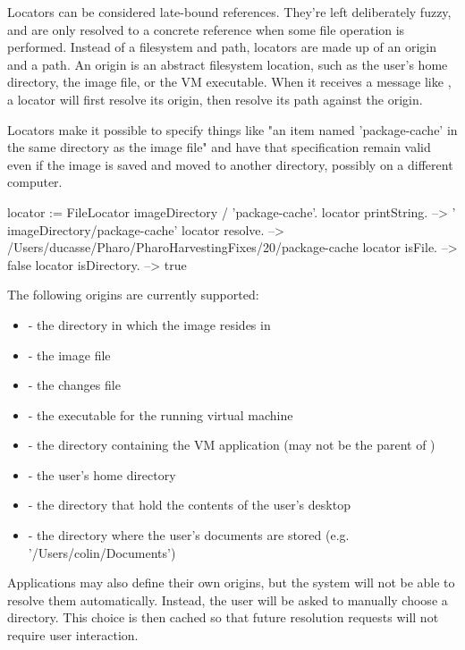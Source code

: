 \documentclass[a4paper,10pt,twoside]{book}
\begin{document}
Locators can be considered late-bound references. They're left deliberately fuzzy, and are only resolved to a concrete reference when some file operation is performed. Instead of a filesystem and path, locators are made up of an origin and a path. An origin is an abstract filesystem location, such as the user's home directory, the image file, or the VM executable. When it receives a message like , a locator will first resolve its origin, then resolve its path against the origin.

Locators make it possible to specify things like "an item named 'package-cache' in the same directory as the image file" and have that specification remain valid even if the image is saved and moved to another directory, possibly on a different computer.

\begin{code}{}
    locator := FileLocator imageDirectory / 'package-cache'.
    locator printString.             --> ' {imageDirectory}/package-cache'
    locator resolve.                 -->  /Users/ducasse/Pharo/PharoHarvestingFixes/20/package-cache
    locator isFile.                  --> false
    locator isDirectory.             --> true
\end{code}	

The following origins are currently supported:

\begin{itemize}
\item {} - the directory in which the image resides in
\item{} - the image file
\item{} - the changes file
\item{} - the executable for the running virtual machine
\item{} - the directory containing the VM application (may not be the parent of )
\item{} - the user's home directory
\item{} - the directory that hold the contents of the user's desktop
\item{} - the directory where the user's documents are stored (e.g. '/Users/colin/Documents')
\end{itemize}

Applications may also define their own origins, but the system will not be able to resolve them automatically. Instead, the user will be asked to manually choose a directory. This choice is then cached so that future resolution requests will not require user interaction.
\end{document}
